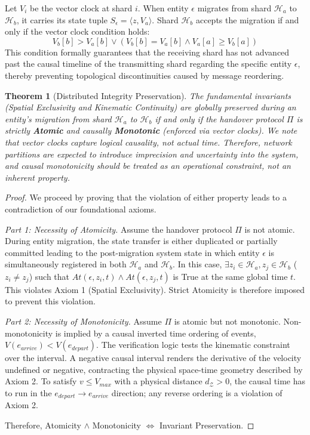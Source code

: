 \documentclass[conference]{IEEEtran}
\newtheorem{theorem}{Theorem}
\newcommand{\Z}{\mathcal{Z}} %
\begin{document}
Let $V_i$ be the vector clock at shard $i$. When entity $\epsilon$ migrates from shard $\mathcal{H}_a$ to $\mathcal{H}_b$, it carries its state tuple $S_\epsilon = \langle z, V_a \rangle$.
Shard $\mathcal{H}_b$ accepts the migration if and only if the vector clock condition holds:
\begin{equation}
V_b[b] > V_a[b] \lor (V_b[b] = V_a[b] \land V_a[a] \ge V_b[a])
\end{equation}
This condition formally guarantees that the receiving shard has not advanced past the causal timeline of the transmitting shard regarding the specific entity $\epsilon$, thereby preventing topological discontinuities caused by message reordering.

\begin{theorem}[Distributed Integrity Preservation]
The fundamental invariants (Spatial Exclusivity and Kinematic Continuity) are globally preserved during an entity's migration from shard $\mathcal{H}_a$ to $\mathcal{H}_b$ if and only if the handover protocol $\Pi$ is strictly \textbf{Atomic} and causally \textbf{Monotonic} (enforced via vector clocks). We note that vector clocks capture logical causality, not actual time. Therefore, network partitions are expected to introduce imprecision and uncertainty into the system, and causal monotonicity should be treated as an operational constraint, not an inherent property.
\end{theorem}

\begin{proof}
We proceed by proving that the violation of either property leads to a contradiction of our foundational axioms.

\textit{Part 1: Necessity of Atomicity.} 
Assume the handover protocol $\Pi$ is not atomic. During entity migration, the state transfer is either duplicated or partially committed leading to the post-migration system state in which entity $\epsilon$ is simultaneously registered in both $\mathcal{H}_a$ and $\mathcal{H}_b$. In this case, $\exists z_i \in \mathcal{H}_a, z_j \in \mathcal{H}_b$ ($z_i \neq z_j$) such that $At(\epsilon, z_i, t) \land At(\epsilon, z_j, t)$ is True at the same global time $t$. This violates Axiom 1 (Spatial Exclusivity). Strict Atomicity is therefore imposed to prevent this violation.

\textit{Part 2: Necessity of Monotonicity.}
Assume $\Pi$ is atomic but not monotonic. Non-monotonicity is implied by a causal inverted time ordering of events, $V(e_{arrive}) < V(e_{depart})$. The verification logic tests the kinematic constraint over the interval. A negative causal interval renders the derivative of the velocity undefined or negative, contracting the physical space-time geometry described by Axiom 2. To satisfy $v \le V_{max}$ with a physical distance $d_\Z > 0$, the causal time has to run in the $e_{depart} \to e_{arrive}$ direction; any reverse ordering is a violation of Axiom 2. 

Therefore, Atomicity $\land$ Monotonicity $\iff$ Invariant Preservation.
\end{proof}
\end{document}
